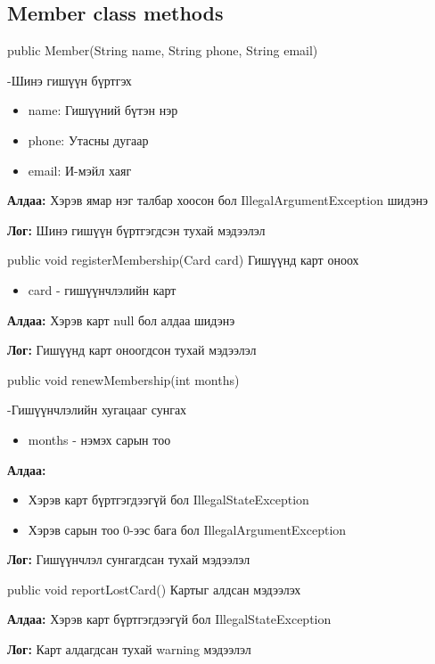 \documentclass[a4paper, 11pt]{article}
\begin{document}
\subsection*{Member class methods}
\begin{description}
    \item{public Member(String name, String phone, String email)}
    \item -Шинэ гишүүн бүртгэх

    \begin{itemize}
        \item name: Гишүүний бүтэн нэр
        \item phone: Утасны дугаар
        \item email: И-мэйл хаяг
    \end{itemize}
    
    \textbf{Алдаа:} Хэрэв ямар нэг талбар хоосон бол IllegalArgumentException шидэнэ
    
    \textbf{Лог:} Шинэ гишүүн бүртгэгдсэн тухай мэдээлэл
    
    \item {public void registerMembership(Card card)}
    Гишүүнд карт оноох
    \begin{itemize}
    \item card - гишүүнчлэлийн карт
     \end{itemize}
    \textbf{Алдаа:} Хэрэв карт null бол алдаа шидэнэ
    
    \textbf{Лог:} Гишүүнд карт оноогдсон тухай мэдээлэл
    
    \item{public void renewMembership(int months)}
    \item -Гишүүнчлэлийн хугацааг сунгах
     \begin{itemize}
    \item months - нэмэх сарын тоо
     \end{itemize}
    \textbf{Алдаа:}
    \begin{itemize}
        \item Хэрэв карт бүртгэгдээгүй бол IllegalStateException
        \item Хэрэв сарын тоо 0-ээс бага бол IllegalArgumentException
    \end{itemize}
    
    \textbf{Лог:} Гишүүнчлэл сунгагдсан тухай мэдээлэл
    
    \item{public void reportLostCard()}
    Картыг алдсан мэдээлэх
    
    \textbf{Алдаа:} Хэрэв карт бүртгэгдээгүй бол IllegalStateException
    
    \textbf{Лог:} Карт алдагдсан тухай warning мэдээлэл
\end{description}
\end{document}
